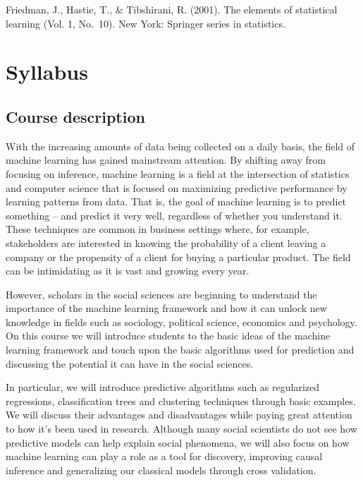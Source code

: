 \documentclass[
]{book}
\begin{document}
Friedman, J., Hastie, T., \& Tibshirani, R. (2001). The elements of statistical learning (Vol. 1, No.~10). New York: Springer series in statistics.

\hypertarget{syllabus}{%
\chapter{Syllabus}\label{syllabus}}

\hypertarget{course-description}{%
\section{Course description}\label{course-description}}

With the increasing amounts of data being collected on a daily basis, the field of machine learning has gained mainstream attention. By shifting away from focusing on inference, machine learning is a field at the intersection of statistics and computer science that is focused on maximizing predictive performance by learning patterns from data. That is, the goal of machine learning is to predict something -- and predict it very well, regardless of whether you understand it. These techniques are common in business settings where, for example, stakeholders are interested in knowing the probability of a client leaving a company or the propensity of a client for buying a particular product. The field can be intimidating as it is vast and growing every year.

However, scholars in the social sciences are beginning to understand the importance of the machine learning framework and how it can unlock new knowledge in fields such as sociology, political science, economics and psychology. On this course we will introduce students to the basic ideas of the machine learning framework and touch upon the basic algorithms used for prediction and discussing the potential it can have in the social sciences.

In particular, we will introduce predictive algorithms such as regularized regressions, classification trees and clustering techniques through basic examples. We will discuss their advantages and disadvantages while paying great attention to how it's been used in research. Although many social scientists do not see how predictive models can help explain social phenomena, we will also focus on how machine learning can play a role as a tool for discovery, improving causal inference and generalizing our classical models through cross validation.
\end{document}
